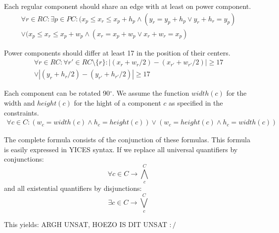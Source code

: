 \documentclass[12pt]{article}
\begin{document}
\vspace{3mm}

Each regular component should share an edge with at least on power component.
\begin{multline}
	\forall r \in RC : \exists p \in PC :
		(x_p \leq x_r \le x_p+h_p \wedge (y_r=y_p+h_p \vee y_r+h_r=y_p)  \\  
		\vee (x_p \leq x_r \le x_p+w_p \wedge (x_r=x_p+w_p \vee x_r+w_r=x_p)
\end{multline}

\vspace{3mm}

Power components should differ at least 17 in the position of their centers.
\begin{multline}
	\forall r \in RC : \forall r' \in RC \setminus \{r\} :
		|(x_r + w_r/2) - (x_{r'} + w_{r'}/2)| \geq 17 \\  
		\vee |(y_r + h_r/2) - (y_{r'} + h_{r'}/2)| \geq 17
\end{multline}

Each component can be rotated 90$^{\circ}$. We assume the function 
$width(c)$ for the width and $height(c)$ for the hight of a component $c$ as
specified in the constraints. 
\begin{multline}
	\forall c \in C : (w_c = width(c) \wedge h_c = height(c))
		\vee (w_c = height(c) \wedge h_c = width(c))
\end{multline}

The complete formula consists of the conjunction of these formulas. This
formula is easily expressed in YICES syntax. If we replace all universal
quantifiers by conjunctions:
\begin{equation}
	\forall c \in C \rightarrow \bigwedge_c^C
\end{equation}
and all existential quantifiers by disjunctions:
\begin{equation}
	\exists c \in C \rightarrow \bigvee_c^C
\end{equation}

This yields: ARGH UNSAT, HOEZO IS DIT UNSAT $:/$
\end{document}

